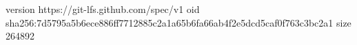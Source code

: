 version https://git-lfs.github.com/spec/v1
oid sha256:7d5795a5b6ece886ff7712885c2a1a65b6fa66ab4f2e5dcd5caf0f763c3bc2a1
size 264892
